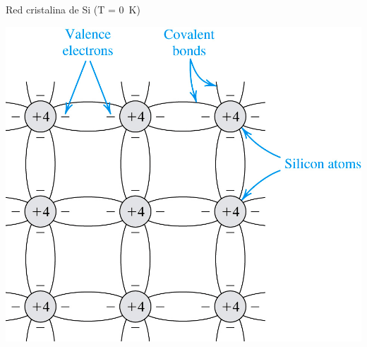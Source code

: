 \documentclass[xcolor={usenames,svgnames,dvipsnames}]{beamer}
\begin{document}
\begin{frame}[label={sec:org924955f}]{Red cristalina de Si (T = \SI{0}{\kelvin})}
\begin{center}
\begin{center}
\includegraphics[width=.9\linewidth]{../figs/silicio_T0K.jpg}
\end{center}
\end{center}
\end{frame}
\end{document}
